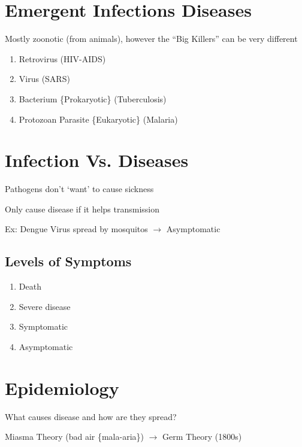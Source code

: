 \documentclass{notes}
\begin{document}
\section{Emergent Infections Diseases}
Mostly zoonotic (from animals), however the ``Big Killers'' can be very different

\begin{enumerate}
    \item Retrovirus (HIV-AIDS)
    \item Virus (SARS)
    \item Bacterium \{Prokaryotic\} (Tuberculosis)
    \item Protozoan Parasite \{Eukaryotic\} (Malaria)
\end{enumerate}

\section{Infection Vs. Diseases}
Pathogens don't `want' to cause sickness

Only cause disease if it helps transmission

\hspace*{10px} Ex: Dengue Virus spread by mosquitos \(\rightarrow\) Asymptomatic

\subsection{Levels of Symptoms}
\begin{enumerate}
    \item Death
    \item Severe disease
    \item Symptomatic
    \item Asymptomatic
\end{enumerate}

\section{Epidemiology}
What causes disease and how are they spread?

Miasma Theory (bad air \{mala-aria\}) \(\rightarrow\) Germ Theory (1800s)
\end{document}
